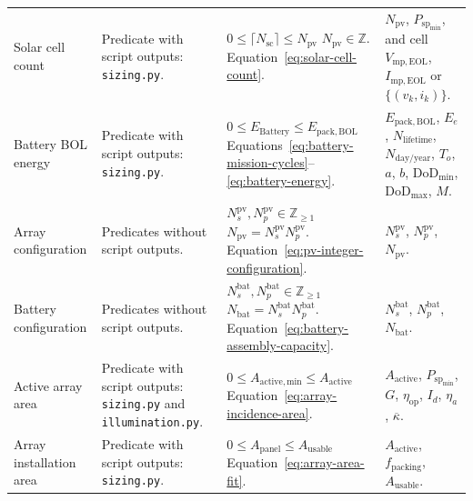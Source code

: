 \begin{longtable}{@{}P{0.18\ReportTableBodyWidth}P{0.21\ReportTableBodyWidth}P{0.29\ReportTableBodyWidth}P{0.32\ReportTableBodyWidth}@{}}
Solar cell count & Predicate with script outputs: \texttt{sizing.py}. & $0\leq\lceil N_{\mathrm{sc}}\rceil\leq N_{\mathrm{pv}}$ \newline $N_{\mathrm{pv}}\in\mathbb Z$. \newline Equation~\eqref{eq:solar-cell-count}. & $N_{\mathrm{pv}}$, $P_{\mathrm{sp}_{\min}}$, and cell $V_{\mathrm{mp,EOL}}$, $I_{\mathrm{mp,EOL}}$ or $\{(v_k,i_k)\}$. \\
\addlinespace[4pt]
Battery BOL energy & Predicate with script outputs: \texttt{sizing.py}. & $0\leq E_{\mathrm{Battery}}\leq E_{\mathrm{pack,BOL}}$ \newline Equations~\eqref{eq:battery-mission-cycles}--\eqref{eq:battery-energy}. & $E_{\mathrm{pack,BOL}}$, $E_e$, $N_{\mathrm{lifetime}}$, $N_{\mathrm{day/year}}$, $T_o$, $a$, $b$, $\mathrm{DoD}_{\min}$, $\mathrm{DoD}_{\max}$, $M$. \\
\addlinespace[4pt]
Array configuration & Predicates without script outputs. & $N_s^{\mathrm{pv}},N_p^{\mathrm{pv}}\in\mathbb Z_{\geq1}$ \newline $N_{\mathrm{pv}}=N_s^{\mathrm{pv}}N_p^{\mathrm{pv}}$. \newline Equation~\eqref{eq:pv-integer-configuration}. & $N_s^{\mathrm{pv}}$, $N_p^{\mathrm{pv}}$, $N_{\mathrm{pv}}$. \\
\addlinespace[4pt]
Battery configuration & Predicates without script outputs. & $N_s^{\mathrm{bat}},N_p^{\mathrm{bat}}\in\mathbb Z_{\geq1}$ \newline $N_{\mathrm{bat}}=N_s^{\mathrm{bat}}N_p^{\mathrm{bat}}$. \newline Equation~\eqref{eq:battery-assembly-capacity}. & $N_s^{\mathrm{bat}}$, $N_p^{\mathrm{bat}}$, $N_{\mathrm{bat}}$. \\
\addlinespace[4pt]
Active array area & Predicate with script outputs: \texttt{sizing.py} and \texttt{illumination.py}. & $0\leq A_{\mathrm{active,min}}\leq A_{\mathrm{active}}$ \newline Equation~\eqref{eq:array-incidence-area}. & $A_{\mathrm{active}}$, $P_{\mathrm{sp}_{\min}}$, $G$, $\eta_{\mathrm{op}}$, $I_d$, $\eta_a$, $\overline\kappa$. \\
\addlinespace[4pt]
Array installation area & Predicate with script outputs: \texttt{sizing.py}. & $0\leq A_{\mathrm{panel}}\leq A_{\mathrm{usable}}$ \newline Equation~\eqref{eq:array-area-fit}. & $A_{\mathrm{active}}$, $f_{\mathrm{packing}}$, $A_{\mathrm{usable}}$. \\

\end{longtable}
